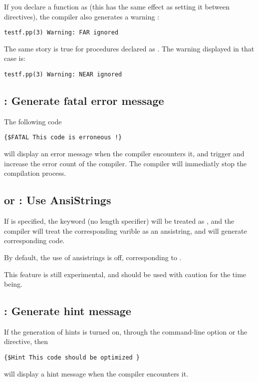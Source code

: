 \documentclass{report}
\begin{document}
If you declare a function as  (this has the same effect as setting it
between  directives), the compiler also generates a
warning :
\begin{verbatim}
testf.pp(3) Warning: FAR ignored
\end{verbatim}

The same story is true for procedures declared as . The warning
displayed in that case is:
\begin{verbatim}
testf.pp(3) Warning: NEAR ignored
\end{verbatim}

\subsection{ : Generate fatal error message}

The following code
\begin{verbatim}
{$FATAL This code is erroneous !}
\end{verbatim}
will display an error message when the compiler encounters it, and trigger
and increase the error count of the compiler. 
The compiler will immediatly stop the compilation process.


\subsection{ or  : Use AnsiStrings}

If  is specified, the keyword  (no
length specifier) will be treated as , and the compiler 
will treat the corresponding varible as an ansistring, and will 
generate corresponding code. 

By default, the use of ansistrings is off, corresponding to .

This feature is still experimental, and should be used with caution for the
time being.

\subsection{ : Generate hint message}

If the generation of hints is turned on, through the  command-line
option or the  directive, then
\begin{verbatim}
{$Hint This code should be optimized }
\end{verbatim}
will display a hint message when the compiler encounters it.
\end{document}
